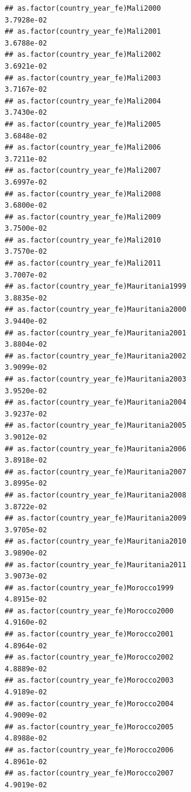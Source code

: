 \documentclass[
  a4paper,
]{article}
\begin{document}
\begin{verbatim}
## as.factor(country_year_fe)Mali2000                              3.7928e-02
## as.factor(country_year_fe)Mali2001                              3.6788e-02
## as.factor(country_year_fe)Mali2002                              3.6921e-02
## as.factor(country_year_fe)Mali2003                              3.7167e-02
## as.factor(country_year_fe)Mali2004                              3.7430e-02
## as.factor(country_year_fe)Mali2005                              3.6848e-02
## as.factor(country_year_fe)Mali2006                              3.7211e-02
## as.factor(country_year_fe)Mali2007                              3.6997e-02
## as.factor(country_year_fe)Mali2008                              3.6800e-02
## as.factor(country_year_fe)Mali2009                              3.7500e-02
## as.factor(country_year_fe)Mali2010                              3.7570e-02
## as.factor(country_year_fe)Mali2011                              3.7007e-02
## as.factor(country_year_fe)Mauritania1999                        3.8835e-02
## as.factor(country_year_fe)Mauritania2000                        3.9440e-02
## as.factor(country_year_fe)Mauritania2001                        3.8804e-02
## as.factor(country_year_fe)Mauritania2002                        3.9099e-02
## as.factor(country_year_fe)Mauritania2003                        3.9520e-02
## as.factor(country_year_fe)Mauritania2004                        3.9237e-02
## as.factor(country_year_fe)Mauritania2005                        3.9012e-02
## as.factor(country_year_fe)Mauritania2006                        3.8918e-02
## as.factor(country_year_fe)Mauritania2007                        3.8995e-02
## as.factor(country_year_fe)Mauritania2008                        3.8722e-02
## as.factor(country_year_fe)Mauritania2009                        3.9705e-02
## as.factor(country_year_fe)Mauritania2010                        3.9890e-02
## as.factor(country_year_fe)Mauritania2011                        3.9073e-02
## as.factor(country_year_fe)Morocco1999                           4.8915e-02
## as.factor(country_year_fe)Morocco2000                           4.9160e-02
## as.factor(country_year_fe)Morocco2001                           4.8964e-02
## as.factor(country_year_fe)Morocco2002                           4.8889e-02
## as.factor(country_year_fe)Morocco2003                           4.9189e-02
## as.factor(country_year_fe)Morocco2004                           4.9009e-02
## as.factor(country_year_fe)Morocco2005                           4.8988e-02
## as.factor(country_year_fe)Morocco2006                           4.8961e-02
## as.factor(country_year_fe)Morocco2007                           4.9019e-02

\end{verbatim}
\end{document}
